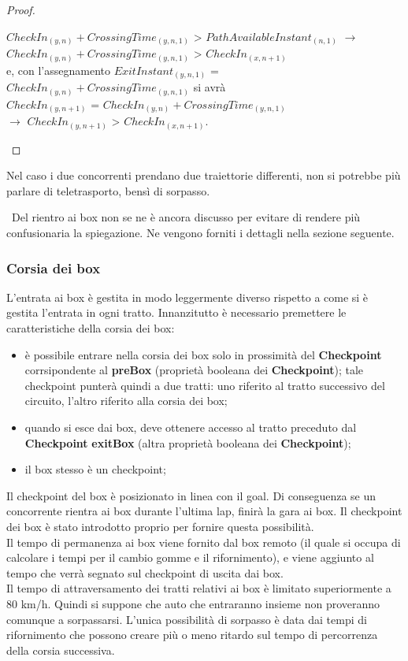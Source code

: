 \begin{itemize}
\begin{proof}
\begin{itemize}
$CheckIn_{(y,n)}+CrossingTime_{(y,n,1)}$ > $PathAvailableInstant_{(n,1)}$ $\rightarrow$\\ 
$CheckIn_{(y,n)}+CrossingTime_{(y,n,1)}$ > $CheckIn_{(x,n+1)}$ \\
e, con l'assegnamento
$ExitInstant_{(y,n,1)}$ = $CheckIn_{(y,n)}+CrossingTime_{(y,n,1)}$ si avrà \\
$CheckIn_{(y,n+1)}$ = $CheckIn_{(y,n)}+CrossingTime_{(y,n,1)}$\\
$\rightarrow$ $CheckIn_{(y,n+1)}$ > $CheckIn_{(x,n+1)}$.
\end{itemize}
\end{proof}
Nel caso i due concorrenti prendano due traiettorie differenti, non si potrebbe più parlare di teletrasporto, bensì di sorpasso.
\end{itemize}
\
Del rientro ai box non se ne \`{e} ancora discusso per evitare di rendere
pi\`{u} confusionaria la spiegazione. Ne vengono forniti i dettagli nella sezione seguente.
\subsubsection{Corsia dei box}
L'entrata ai box è gestita in modo leggermente diverso rispetto a come si è gestita l'entrata in ogni tratto.
Innanzitutto è necessario premettere le caratteristiche della corsia dei box:
\begin{itemize}
\item è possibile entrare nella corsia dei box solo in prossimità del \textbf{Checkpoint} corrsipondente al \textbf{preBox} (proprietà booleana
dei \textbf{Checkpoint}); tale checkpoint punterà quindi a due tratti: uno riferito al tratto successivo del circuito, l'altro riferito
alla corsia dei box;
\item quando si esce dai box, deve ottenere accesso al tratto preceduto dal \textbf{Checkpoint} \textbf{exitBox} (altra proprietà booleana
dei \textbf{Checkpoint});
\item il box stesso è un checkpoint;
\end{itemize}
Il checkpoint del box è posizionato in linea con il goal. Di conseguenza se un concorrente rientra ai 
box durante l'ultima lap, finirà la gara ai box. Il checkpoint dei box è stato introdotto proprio per
fornire questa possibilità.\\
Il tempo di permanenza ai box viene fornito dal box remoto (il quale si occupa di calcolare
i tempi per il cambio gomme e il rifornimento), e viene aggiunto al tempo che verrà segnato sul checkpoint
di uscita dai box.\\
Il tempo di attraversamento dei tratti relativi ai box è limitato superiormente a 80 km/h. Quindi si suppone
che auto che entraranno insieme non proveranno comunque a sorpassarsi. L'unica possibilità di sorpasso è data
dai tempi di rifornimento che possono creare più o meno ritardo sul tempo di percorrenza della corsia successiva.\\

